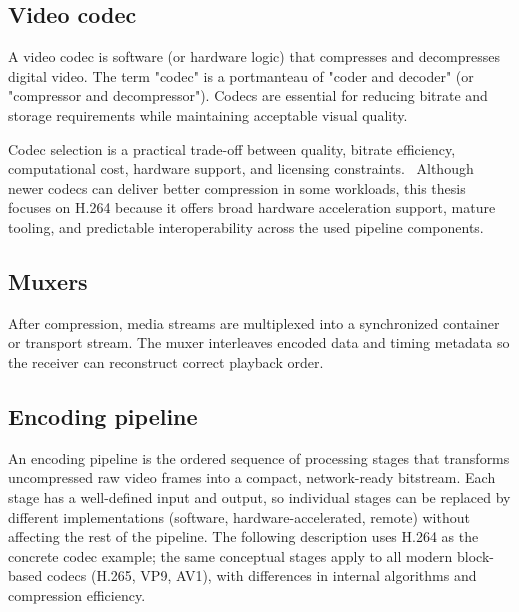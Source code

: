 \subsection{Video codec}
A video codec is software (or hardware logic) that compresses and decompresses digital video. The term "codec" is a portmanteau of "coder and decoder" (or "compressor and decompressor"). Codecs are essential for reducing bitrate and storage requirements while maintaining acceptable visual quality.~\cite{VideoCodec2025,WebVideoCodec2025}

Codec selection is a practical trade-off between quality, bitrate efficiency, computational cost, hardware support, and licensing constraints.~\cite{WebVideoCodec2025,apostolopoulosVideoStreamingConcepts} Although newer codecs can deliver better compression in some workloads, this thesis focuses on H.264 because it offers broad hardware acceleration support, mature tooling, and predictable interoperability across the used pipeline components.

\subsection{Muxers}
After compression, media streams are multiplexed into a synchronized container or transport stream. The muxer interleaves encoded data and timing metadata so the receiver can reconstruct correct playback order.~\cite{apostolopoulosVideoStreamingConcepts,WebVideoCodec2025}

\subsection{Encoding pipeline}
\label{sec:encoding_pipeline}
An encoding pipeline is the ordered sequence of processing stages that transforms uncompressed raw video frames into a compact, network-ready bitstream. Each stage has a well-defined input and output, so individual stages can be replaced by different implementations (software, hardware-accelerated, remote) without affecting the rest of the pipeline. The following description uses H.264 as the concrete codec example; the same conceptual stages apply to all modern block-based codecs (H.265, VP9, AV1), with differences in internal algorithms and compression efficiency.~\cite{apostolopoulosVideoStreamingConcepts,WebVideoCodec2025}

